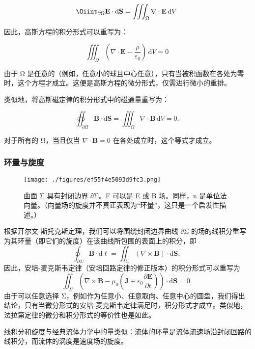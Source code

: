 \[\Oiint_{\scriptstyle \partial \Omega} \mathbf{E} \cdot \mathrm{d} \mathbf{S} = \iiint_{\Omega} \nabla \cdot \mathbf{E} \, \mathrm{d} V~\]

因此，高斯方程的积分形式可以重写为：

\[\iiint_{\Omega} \left(\nabla \cdot \mathbf{E} - \frac{\rho}{\varepsilon_0}\right) \, \mathrm{d} V = 0~\]

由于 Ω 是任意的（例如，任意小的球且中心任意），只有当被积函数在各处为零时，这个方程才成立。这便是高斯方程的微分形式，仅需进行微小的重排。

类似地，将高斯磁定律的积分形式中的磁通量重写为：

\[\oiint_{\scriptstyle \partial \Omega} \mathbf{B} \cdot \mathrm{d} \mathbf{S} = \iiint_{\Omega} \nabla \cdot \mathbf{B} \, \mathrm{d} V = 0.~\]

对于所有的 Ω，当且仅当 \(\nabla \cdot \mathbf{B} = 0\) 在各处成立时，这个等式才成立。
\subsubsection{环量与旋度}
\begin{figure}[ht]
\centering
\texttt{[image: ./figures/ef55f4e5093d9fc3.png]}
\caption{曲面 Σ 具有封闭边界 ∂Σ。F 可以是 E 或 B 场。同样，n 是单位法向量。（向量场的旋度并不真正表现为“环量”，这只是一个启发性描述。）} \label{fig_MAXS_8}
\end{figure}
根据开尔文-斯托克斯定理，我们可以将围绕封闭边界曲线 ∂Σ 的场的线积分重写为其环量（即它们的旋度）在该曲线所包围的表面上的积分，即
\[
\oint _{\partial \Sigma }\mathbf {B} \cdot \mathrm {d} {\boldsymbol {\ell }}=\iint _{\Sigma }(\nabla \times \mathbf {B} )\cdot \mathrm {d} \mathbf {S} ,~
\]
因此，安培-麦克斯韦定律（安培回路定律的修正版本）的积分形式可以重写为
\[
\iint _{\Sigma }\left(\nabla \times \mathbf {B} -\mu _{0}\left(\mathbf {J} +\varepsilon _{0}{\frac {\partial \mathbf {E} }{\partial t}}\right)\right)\cdot \mathrm {d} \mathbf {S} =0.~
\]
由于可以任意选择 Σ，例如作为任意小、任意取向、任意中心的圆盘，我们得出结论，只有当微分形式的安培-麦克斯韦定律满足时，积分形式才成立。类似地，法拉第定律的微分和积分形式的等价性也是如此。

线积分和旋度与经典流体力学中的量类似：流体的环量是流体流速场沿封闭回路的线积分，而流体的涡度是速度场的旋度。
